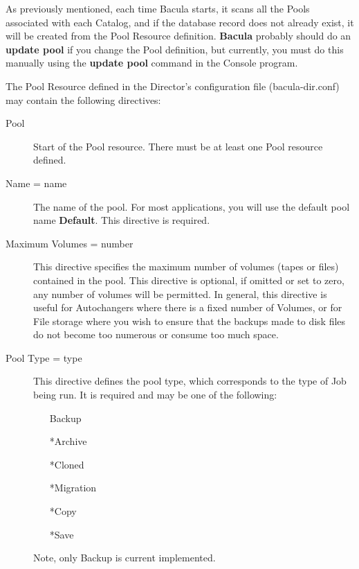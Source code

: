 As previously mentioned, each time Bacula starts, it scans all the Pools
associated with each Catalog, and if the database record does not already
exist, it will be created from the Pool Resource definition. {\bf Bacula}
probably should do an {\bf update pool} if you change the Pool definition, but
currently, you must do this manually using the {\bf update pool} command in
the Console program. 

The Pool Resource defined in the Director's configuration file
(bacula-dir.conf) may contain the following directives: 

\begin{description}

\item [Pool]
   Start of the Pool resource.  There must be at least one Pool resource
   defined.


\item [Name = \lt{}name\gt{}]
   The name of the pool.  For most applications, you will use the default
   pool name {\bf Default}.  This directive is required.

\label{MaxVolumes}
\item [Maximum Volumes = \lt{}number\gt{}]
   This directive specifies the maximum number of volumes (tapes or files)
   contained in the pool.  This directive is optional, if omitted or set to
   zero, any number of volumes will be permitted.  In general, this
   directive is useful for Autochangers where there is a fixed number of
   Volumes, or for File storage where you wish to ensure that the backups
   made to disk files do not become too numerous or consume too much space.

\item [Pool Type = \lt{}type\gt{}]
   This directive defines the pool type, which corresponds to the type of
   Job being run.  It is required and may be one of the following:

\begin{itemize}
  \item [Backup]  
  \item [*Archive]  
  \item [*Cloned]  
  \item [*Migration]  
  \item [*Copy]  
  \item [*Save]  
\end{itemize}
   Note, only Backup is current implemented.


\end{description}
